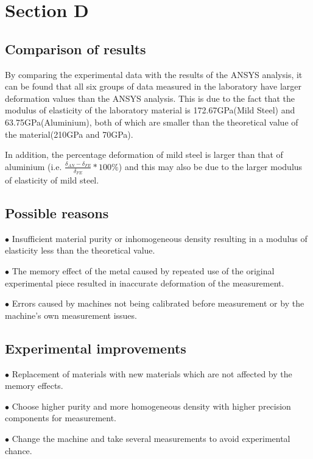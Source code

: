 \section*{Section D}
\label{sec:Section D}
\FloatBarrier %


\subsection*{Comparison of results}

By comparing the experimental data with the results of the ANSYS analysis, 
it can be found that all six groups of data measured in the laboratory have 
larger deformation values than the ANSYS analysis. This is due to the fact 
that the modulus of elasticity of the laboratory material is 172.67GPa(Mild Steel) and 63.75GPa(Aluminium), 
both of which are smaller than the theoretical value of the material(210GPa and 70GPa).


In addition, the percentage deformation of mild steel is larger than 
that of aluminium 
(i.e. $\frac{\delta_{AN}-\delta_{FE}}{\delta_{FE}}*100\%$)
and this may also be due to the larger modulus of elasticity of mild steel.

\subsection*{Possible reasons}
$\bullet$ Insufficient material purity or inhomogeneous density 
resulting in a modulus of elasticity less than the theoretical value.

$\bullet$ The memory effect of the metal caused by repeated use of the original 
experimental piece resulted in inaccurate deformation of the measurement.

$\bullet$ Errors caused by machines not being calibrated before measurement or 
by the machine's own measurement issues.

\subsection*{Experimental improvements}

$\bullet$ Replacement of materials with new materials which are not affected by 
the memory effects.

$\bullet$ Choose higher purity and more homogeneous density with higher precision 
components for measurement.

$\bullet$ Change the machine and take several measurements to avoid experimental chance.